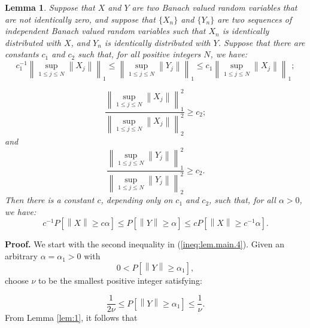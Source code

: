 \newtheorem{lem:main}[lem:1]{Lemma}
\begin{lem:main}
Suppose that $X$ and $Y$ are two Banach valued random variables
that are not identically zero, and suppose that $\{
X_n\}$ and $\{ Y_n\}$ are two sequences of independent
Banach valued random variables such that $X_n$ is identically
distributed with $X$, and $Y_n$ is identically distributed with
$Y$.  Suppose that there are constants $c_1$ and $c_2$ such that, for
all positive integers $N$, we have:
\begin{equation}
c_1^{-1} \left\| \sup_{1 \leq j \leq N}\left\| X_j\right\|  \right\|_1
\leq
\left\| \sup_{1 \leq j \leq N}\left\| Y_j\right\|  \right\|_1
\leq
c_1\left\| \sup_{1 \leq j \leq N}\left\| X_j\right\|  \right\|_1 ;
\label{ineq:lem.main.1}
\end{equation}


\begin{equation}
\frac{\left\| \sup_{1 \leq j \leq N}\left\| X_j\right\|  \right\|^2_1}
{\left\| \sup_{1 \leq j \leq N}\left\| X_j\right\|  \right\|^2_2}
\geq c_2 ;
\label{ineq:lem.main.2}
\end{equation}
and
\begin{equation}
\frac{\left\| \sup_{1 \leq j \leq N}\left\| Y_j\right\|  \right\|^2_1}
{\left\| \sup_{1 \leq j \leq N}\left\| Y_j\right\|  \right\|^2_2}
\geq c_2 .
\label{ineq:lem.main.3}
\end{equation}
Then there is a constant $c$, depending only on $c_1$ and $c_2$, such
that, for all $\alpha > 0$, we have:
\begin{equation}
c^{-1}P\left[ \left\| X\right\| \geq c\alpha \right] \leq
P\left[ \left\| Y\right\| \geq \alpha \right] \leq
cP\left[ \left\| X\right\| \geq c^{-1}\alpha \right].
\label{ineq:lem.main.4}
\end{equation}
\label{lem:main}
\end{lem:main}

{\bf Proof.}  We start with the second inequality in
(\ref{ineq:lem.main.4}).  Given an arbitrary $\alpha = \alpha_1 > 0$ with
\begin{equation}
0 < P\left[\left\|Y\right\| \geq \alpha_1\right],
\label{eq:1}
\end{equation}
choose $\nu$ to be the smallest positive integer satisfying:


\begin{equation}
\frac{1}{2\nu}\leq P\left[\left\|Y\right\| \geq \alpha_1\right] \leq
\frac{1}{\nu}.
\label{eq:2}
\end{equation}
From Lemma \ref{lem:1}, it follows that

